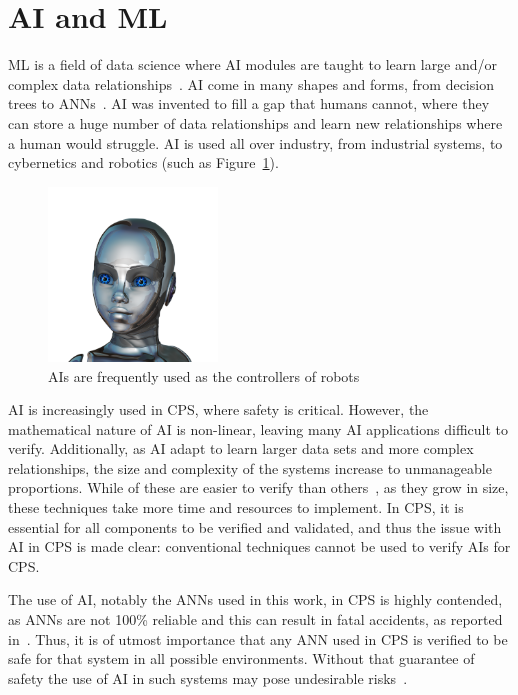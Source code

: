 \section{\acf{AI} and \acf{ML}}
\acf{ML} is a field of data science where \acf{AI} modules are taught to learn large and/or complex data relationships~\cite{ai}.
\ac{AI} come in many shapes and forms, from decision trees to \acfp{ANN}~\cite{ai-types}.
\ac{AI} was invented to fill a gap that humans cannot, where they can store a huge number of data relationships and learn new relationships where a human would struggle.
\ac{AI} is used all over industry, from industrial systems, to cybernetics and robotics (such as Figure~\ref{fig:ai-girl}).

\begin{figure}[h]
	\centering
	\includegraphics[width=0.4\textwidth]{Content/fig/ai-girl.png}
	\caption{\acp{AI} are frequently used as the controllers of robots~\cite{robotgirl-pic} \label{fig:ai-girl}}
\end{figure}

\ac{AI} is increasingly used in \ac{CPS}, where safety is critical.
However, the mathematical nature of \ac{AI} is non-linear, leaving many \ac{AI} applications difficult to verify.
Additionally, as \ac{AI} adapt to learn larger data sets and more complex relationships, the size and complexity of the systems increase to unmanageable proportions.
While of these are easier to verify than others~\cite{aiverify}, as they grow in size, these techniques take more time and resources to implement.
In \ac{CPS}, it is essential for all components to be verified and validated, and thus the issue with \ac{AI} in \ac{CPS} is made clear: conventional techniques cannot be used to verify \acp{AI} for \ac{CPS}.

The use of \ac{AI}, notably the \acp{ANN} used in this work, in \ac{CPS} is highly contended, as \acp{ANN} are not 100\% reliable and this can result in fatal accidents, as reported in~\cite{coldewey_2018}.
Thus, it is of utmost importance that any \ac{ANN} used in \ac{CPS} is verified to be safe for that system in all possible environments.
Without that guarantee of safety the use of \ac{AI} in such systems may pose undesirable risks~\cite{ANNSafety2018}.

